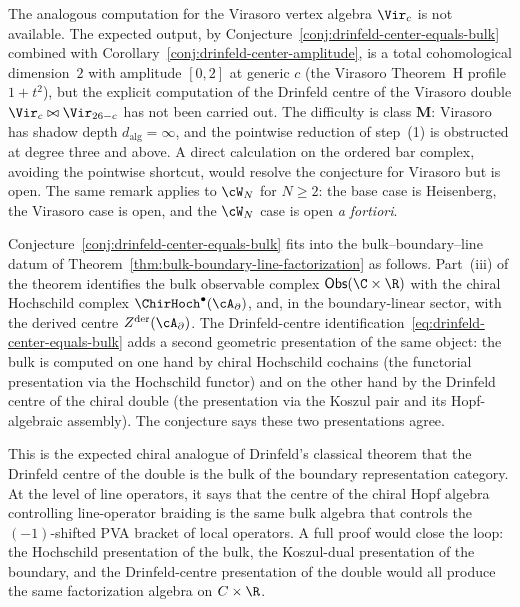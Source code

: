 \begin{remark}
\label{rem:drinfeld-center-virasoro-open}
The analogous computation for the Virasoro vertex algebra $\Vir_c$ is
not available. The expected output, by
Conjecture~\textup{\ref{conj:drinfeld-center-equals-bulk}} combined
with Corollary~\textup{\ref{conj:drinfeld-center-amplitude}}, is a
total cohomological dimension~$2$ with amplitude $[0,2]$ at generic
$c$ \textup{(}the Virasoro Theorem~H profile $1+t^2$\textup{)},
but the explicit computation of the Drinfeld centre of the Virasoro
double $\Vir_c \bowtie \Vir_{26-c}$ has not been carried out. The
difficulty is class $\mathbf{M}$: Virasoro has shadow depth
$d_{\mathrm{alg}} = \infty$, and the pointwise reduction of step~(1) is
obstructed at degree three and above. A direct calculation on the
ordered bar complex, avoiding the pointwise shortcut, would resolve the
conjecture for Virasoro but is open. The same remark applies to $\cW_N$
for $N \ge 2$: the base case is Heisenberg, the Virasoro case is open,
and the $\cW_N$ case is open \emph{a fortiori}.
\end{remark}

\begin{remark}
\label{rem:drinfeld-center-bulk-boundary}
Conjecture~\textup{\ref{conj:drinfeld-center-equals-bulk}} fits into the
bulk--boundary--line datum of
Theorem~\textup{\ref{thm:bulk-boundary-line-factorization}} as follows.
Part~(iii) of the theorem identifies the bulk observable complex
$\mathsf{Obs}(\C \times \R)$ with the chiral Hochschild complex
$\ChirHoch^\bullet(\cA_\partial)$, and, in the boundary-linear sector,
with the derived centre $Z^{\mathrm{der}}(\cA_\partial)$. The
Drinfeld-centre identification~\eqref{eq:drinfeld-center-equals-bulk}
adds a second geometric presentation of the same object: the bulk is
computed on one hand by chiral Hochschild cochains (the functorial
presentation via the Hochschild functor) and on the other hand by the
Drinfeld centre of the chiral double (the presentation via the Koszul
pair and its Hopf-algebraic assembly). The conjecture says these two
presentations agree.

This is the expected chiral analogue of Drinfeld's classical theorem
that the Drinfeld centre of the double is the bulk of the boundary
representation category. At the level of line operators, it says that
the centre of the chiral Hopf algebra controlling line-operator braiding
is the same bulk algebra that controls the $(-1)$-shifted PVA bracket of
local operators. A full proof would close the loop: the Hochschild
presentation of the bulk, the Koszul-dual presentation of the boundary,
and the Drinfeld-centre presentation of the double would all produce
the same factorization algebra on $C \times \R$.
\end{remark}

